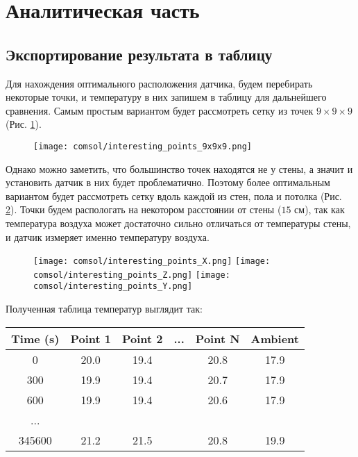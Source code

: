 \graphicspath{{./images/algo}}
\section{Аналитическая часть}

\subsection{Экспортирование результата в таблицу}

Для нахождения оптимального расположения датчика, будем перебирать некоторые точки, и температуру в них запишем в таблицу для дальнейшего сравнения. Самым простым вариантом будет рассмотреть сетку из точек $9 \times 9 \times 9$ (Рис. \ref{9x9x9}).

\begin{figure}[H]
\texttt{[image: comsol/interesting\_points\_9x9x9.png]}
\caption{}
\label{9x9x9}
\end{figure}

Однако можно заметить, что большинство точек находятся не у стены, а значит и установить датчик в них будет проблематично. Поэтому более оптимальным вариантом будет рассмотреть сетку вдоль каждой из стен, пола и потолка (Рис. \ref{interesting_points}). Точки будем распологать на некотором расстоянии от стены ($15$ см), так как температура воздуха может достаточно сильно отличаться от температуры стены, и датчик измеряет именно температуру воздуха.

\begin{figure}[H]
\texttt{[image: comsol/interesting\_points\_X.png]}
\texttt{[image: comsol/interesting\_points\_Z.png]}
\texttt{[image: comsol/interesting\_points\_Y.png]}
\caption{}
\label{interesting_points}
\end{figure}

Полученная таблица температур выглядит так:

\begin{table}[H]
\centering
\begin{tabular}{c|c|c|c|c|c}
\textbf{Time (s)} & \textbf{Point 1} & \textbf{Point 2} & ... & \textbf{Point N} & \textbf{Ambient} \\ \hline
0                 & 20.0             & 19.4             &     & 20.8              & 17.9             \\
300               & 19.9             & 19.4             &     & 20.7              & 17.9             \\
600               & 19.9             & 19.4             &     & 20.6              & 17.9             \\
...               &                  &                  &     &                   &                  \\
345600            & 21.2             & 21.5             &     & 20.8              & 19.9            
\end{tabular}
\end{table}

